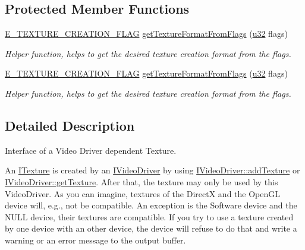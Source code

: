 \subsection*{Protected Member Functions}
\begin{DoxyCompactItemize}
\item 
\hyperlink{namespaceirr_1_1video_acaf6f7414534f7d62bff18c5bf11876f}{E\+\_\+\+T\+E\+X\+T\+U\+R\+E\+\_\+\+C\+R\+E\+A\+T\+I\+O\+N\+\_\+\+F\+L\+AG} \hyperlink{classirr_1_1video_1_1ITexture_afff3160f6aa5f749365ae4f776a440f3}{get\+Texture\+Format\+From\+Flags} (\hyperlink{namespaceirr_a0416a53257075833e7002efd0a18e804}{u32} flags)
\begin{DoxyCompactList}\small\item\em Helper function, helps to get the desired texture creation format from the flags. \end{DoxyCompactList}\item 
\hyperlink{namespaceirr_1_1video_acaf6f7414534f7d62bff18c5bf11876f}{E\+\_\+\+T\+E\+X\+T\+U\+R\+E\+\_\+\+C\+R\+E\+A\+T\+I\+O\+N\+\_\+\+F\+L\+AG} \hyperlink{classirr_1_1video_1_1ITexture_afff3160f6aa5f749365ae4f776a440f3}{get\+Texture\+Format\+From\+Flags} (\hyperlink{namespaceirr_a0416a53257075833e7002efd0a18e804}{u32} flags)
\begin{DoxyCompactList}\small\item\em Helper function, helps to get the desired texture creation format from the flags. \end{DoxyCompactList}\end{DoxyCompactItemize}


\subsection{Detailed Description}
Interface of a Video Driver dependent Texture. 

An \hyperlink{classirr_1_1video_1_1ITexture}{I\+Texture} is created by an \hyperlink{classirr_1_1video_1_1IVideoDriver}{I\+Video\+Driver} by using \hyperlink{classirr_1_1video_1_1IVideoDriver_a8c02ee280bb738cdf38b77e7a798244e}{I\+Video\+Driver\+::add\+Texture} or \hyperlink{classirr_1_1video_1_1IVideoDriver_af4055165190e4adf221c6dc6f2434ea0}{I\+Video\+Driver\+::get\+Texture}. After that, the texture may only be used by this Video\+Driver. As you can imagine, textures of the DirectX and the Open\+GL device will, e.\+g., not be compatible. An exception is the Software device and the N\+U\+LL device, their textures are compatible. If you try to use a texture created by one device with an other device, the device will refuse to do that and write a warning or an error message to the output buffer. 

